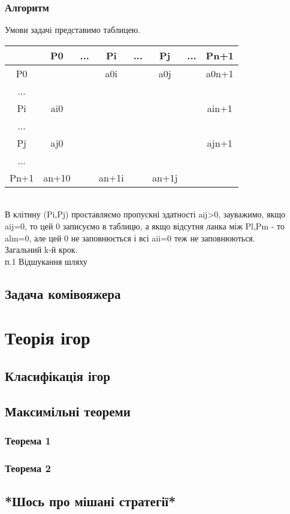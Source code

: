 \documentclass[12pt]{book}
\begin{document}
\subsection{Алгоритм}
Умови задачі представимо таблицею.\\
\begin{tabular}{ | c | c | c | c | c | c | c | c | }
\hline
	&	P0	&	...	&	Pi	&	...	&	Pj	&	...	&	Pn+1\\
\hline
P0	&		&		&	a0i	&		&	a0j	&		&	a0n+1\\
\hline
...	&		&		&		&		&		&		&\\
\hline
Pi	&	ai0	&		&		&		&		&		&	ain+1\\
\hline
...	&		&		&		&		&		&		&\\
\hline
Pj	&	aj0	&		&		&		&		&		&	ajn+1\\
\hline
...	&		&		&		&		&		&		&\\
\hline
Pn+1	&	an+10	&		&	an+1i	&		&	an+1j	&		&\\
\hline
\end{tabular}\\
В клітину (Pi,Pj) проставляємо пропускні здатності aij>0, зауважимо, якщо aij=0, то цей 0 записуємо в таблицю, а якщо відсутня ланка між Pl,Pm - то alm=0, але цей 0 не заповнюється і всі aii=0 теж не заповнюються.\\
Загальний k-й крок.\\
п.1 Відшукання шляху 
\section{Задача комівояжера}
\chapter{Теорія ігор}
\section{Класифікація ігор}
\section{Максимільні теореми}
\subsection{Теорема 1}
\subsection{Теорема 2}
\section{*Шось про мішані стратегії*}
\end{document}
